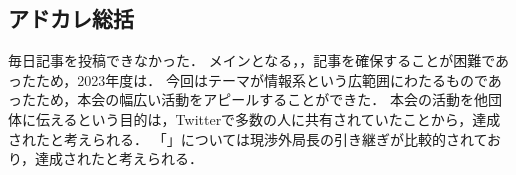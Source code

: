 \subsection*{アドカレ総括}


毎日記事を投稿できなかった．
メインとなる\firstGrade，，記事を確保することが困難であったため，2023年度は．
今回はテーマが情報系という広範囲にわたるものであったため，本会の幅広い活動をアピールすることができた．
本会の活動を他団体に伝えるという目的は，Twitterで多数の人に共有されていたことから，達成されたと考えられる．
「」については現渉外局長の引き継ぎが比較的されており，達成されたと考えられる．
